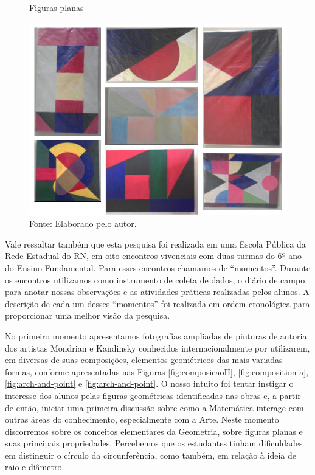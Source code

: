 \begin{refsection}
    \begin{figure}[ht]%
        \centering%
        \caption{Figuras planas}%
        \includegraphics[width=.5\textwidth]{articles/04-matematica-na-arte--/figura1.jpg}%
        \caption*{Fonte: Elaborado pelo autor.}%
        \label{fig:figuras-planas}%
    \end{figure}%

    Vale ressaltar também que esta pesquisa foi realizada em uma Escola Pública da Rede Estadual do RN, em oito encontros vivenciais com duas turmas do 6º ano do Ensino Fundamental. Para esses encontros chamamos de “momentos”. Durante os encontros utilizamos como instrumento de coleta de dados, o diário de campo, para anotar nossas observações e as atividades práticas realizadas pelos alunos. A descrição de cada um desses “momentos” foi realizada em ordem cronológica para proporcionar uma melhor visão da pesquisa.  

    No primeiro momento apresentamos fotografias ampliadas de pinturas de autoria dos artistas Mondrian e Kandinsky conhecidos internacionalmente por utilizarem, em diversas de suas composições, elementos geométricos das mais variadas formas, conforme apresentadas nas Figuras \ref{fig:composicaoII}, \ref{fig:composition-a}, \ref{fig:arch-and-point} e \ref{fig:arch-and-point}. O nosso intuito foi tentar instigar o interesse dos alunos pelas figuras geométricas identificadas nas obras e, a partir de então, iniciar uma primeira discussão sobre como a Matemática interage com outras áreas do conhecimento, especialmente com a Arte. Neste momento discorremos sobre os conceitos elementares da Geometria, sobre figuras planas e suas principais propriedades. Percebemos que os estudantes tinham dificuldades em distinguir o círculo da circunferência, como também, em relação à ideia de raio e diâmetro. 


\end{refsection}
